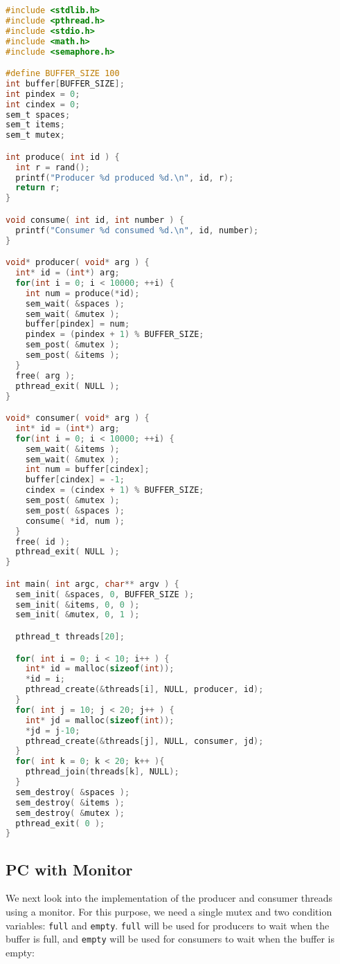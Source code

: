 \begin{lstlisting}[language=C]
#include <stdlib.h>
#include <pthread.h>
#include <stdio.h>
#include <math.h>
#include <semaphore.h>

#define BUFFER_SIZE 100
int buffer[BUFFER_SIZE];
int pindex = 0;
int cindex = 0;
sem_t spaces;
sem_t items;
sem_t mutex;

int produce( int id ) {
  int r = rand();
  printf("Producer %d produced %d.\n", id, r);
  return r;
}

void consume( int id, int number ) {
  printf("Consumer %d consumed %d.\n", id, number);
}

void* producer( void* arg ) {
  int* id = (int*) arg;
  for(int i = 0; i < 10000; ++i) {
    int num = produce(*id); 
    sem_wait( &spaces );
    sem_wait( &mutex );
    buffer[pindex] = num;
    pindex = (pindex + 1) % BUFFER_SIZE;
    sem_post( &mutex );
    sem_post( &items );
  }
  free( arg );
  pthread_exit( NULL );
}

void* consumer( void* arg ) {
  int* id = (int*) arg;
  for(int i = 0; i < 10000; ++i) {
    sem_wait( &items );
    sem_wait( &mutex );
    int num = buffer[cindex];
    buffer[cindex] = -1;
    cindex = (cindex + 1) % BUFFER_SIZE;
    sem_post( &mutex );
    sem_post( &spaces );
    consume( *id, num );
  }
  free( id );
  pthread_exit( NULL );
}

int main( int argc, char** argv ) {
  sem_init( &spaces, 0, BUFFER_SIZE );
  sem_init( &items, 0, 0 );  
  sem_init( &mutex, 0, 1 );

  pthread_t threads[20];

  for( int i = 0; i < 10; i++ ) {
    int* id = malloc(sizeof(int));
    *id = i;
    pthread_create(&threads[i], NULL, producer, id);
  }
  for( int j = 10; j < 20; j++ ) {
    int* jd = malloc(sizeof(int));
    *jd = j-10;
    pthread_create(&threads[j], NULL, consumer, jd);
  }
  for( int k = 0; k < 20; k++ ){  
    pthread_join(threads[k], NULL);
  }
  sem_destroy( &spaces );
  sem_destroy( &items );
  sem_destroy( &mutex );
  pthread_exit( 0 );
}
\end{lstlisting}


\subsection*{PC with Monitor}

We next look into the implementation of the producer and consumer threads using a monitor.
For this purpose, we need a single mutex and two condition variables: \texttt{full} and \texttt{empty}.
\texttt{full} will be used for producers to wait when the buffer is full, and \texttt{empty} will be used for consumers to wait when the buffer is empty:

